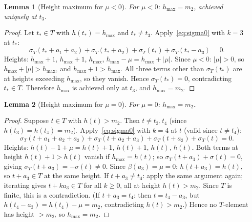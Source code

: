 \documentclass{article}
\newtheorem{lemma}{Lemma}
\begin{document}
\begin{lemma}[Height maximum for $\mu<0$]\label{lem:betamax4neg}
For $\mu<0$: $h_{\max}=m_2$, achieved uniquely at $t_3$.
\end{lemma}
\begin{proof}
Let $t_*\in T$ with $h(t_*)=h_{\max}$ and $t_*\ne t_3$.
Apply~\eqref{eq:sigma0} with $k=3$ at $t_*$:
\[
  \sigma_T(t_*+a_1+a_2)+\sigma_T(t_*+a_2)+\sigma_T(t_*)+\sigma_T(t_*-a_3)=0.
\]
Heights: $h_{\max}+1$, $h_{\max}+1$, $h_{\max}$, $h_{\max}-\mu=h_{\max}+|\mu|$.
Since $\mu<0$: $|\mu|>0$, so $h_{\max}+|\mu|>h_{\max}$, and $h_{\max}+1>h_{\max}$.
All three terms other than $\sigma_T(t_*)$ are at heights exceeding $h_{\max}$, so they vanish.
Hence $\sigma_T(t_*)=0$, contradicting $t_*\in T$.
Therefore $h_{\max}$ is achieved only at $t_3$, and $h_{\max}=m_2$.
\end{proof}

\begin{lemma}[Height maximum for $\mu=0$]\label{lem:betamax4zero}
For $\mu=0$: $h_{\max}=m_2$.
\end{lemma}
\begin{proof}
Suppose $t\in T$ with $h(t)>m_2$.  Then $t\ne t_3,t_4$ (since $h(t_3)=h(t_4)=m_2$).
Apply~\eqref{eq:sigma0} with $k=4$ at $t$ (valid since $t\ne t_4$):
\[
  \sigma_T(t+a_1+a_2+a_3)+\sigma_T(t+a_2+a_3)+\sigma_T(t+a_3)+\sigma_T(t)=0.
\]
Heights: $h(t)+1+\mu=h(t)+1$, $h(t)+1$, $h(t)$, $h(t)$.
Both terms at height $h(t)+1>h(t)$ vanish if $h_{\max}=h(t)$;
so $\sigma_T(t+a_3)+\sigma(t)=0$, giving $\sigma_T(t+a_3)=-\sigma(t)\ne 0$.
Since $\beta(a_3)=\mu=0$: $h(t+a_3)=h(t)$, so $t+a_3\in T$ at the same height.
If $t+a_3\ne t_4$: apply the same argument again; iterating gives $t+ka_3\in T$ for all $k\ge 0$,
all at height $h(t)>m_2$.  Since $T$ is finite, this is a contradiction.
(If $t+a_3=t_4$: then $t=t_4-a_3$, but $h(t_4-a_3)=h(t_4)-\mu=m_2$, contradicting $h(t)>m_2$.)
Hence no $T$-element has height $>m_2$, so $h_{\max}=m_2$.
\end{proof}
\end{document}
